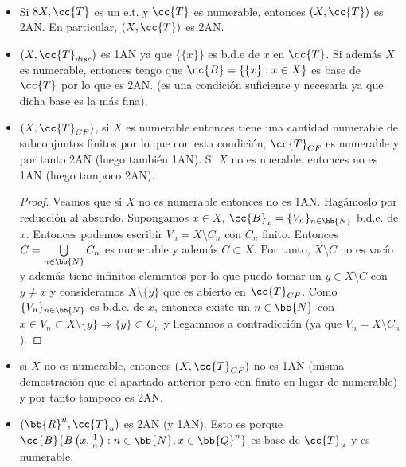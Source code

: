\begin{ejemplo}\
    \begin{itemize}
        \item Si $8X, \cc{T}$ es un e.t. y $\cc{T}$ es numerable, entonces $(X, \cc{T})$ es 2AN. En particular, $(X, \cc{T})$ es 2AN.
        \item $(X, \cc{T}_{disc})$ es 1AN ya que $\{\{x\}\}$ es b.d.e de $x$ en $\cc{T}$. Si además $X$ es numerable, entonces tengo que $\cc{B}=\{\{x\}:x\in X\}$ es base de $\cc{T}$ por lo que es 2AN. (es una condición suficiente y necesaria ya que dicha base es la más fina).
        \item $(X, \cc{T}_{CF})$, si $X$ es numerable entonces tiene una cantidad numerable de subconjuntos finitos por lo que con esta condición, $\cc{T}_{CF}$ es numerable y por tanto 2AN (luego también 1AN). Si $X$ no es nuerable, entonces no es 1AN (luego tampoco 2AN).
        
        \begin{proof}
            Veamos que si $X$ no es numerable entonces no es 1AN. Hagámoslo por reducción al absurdo. Supongamos $x \in X$, $\cc{B}_x=\{V_n\}_{n\in \bb{N}}$ b.d.e. de $x$. Entonces podemos escribir $V_n = X \setminus C_n$ con $C_n$ finito. Entonces $C=\bigcup\limits_{n\in \bb{N}}C_n$ es numerable y además $C\subset X$. Por tanto, $X\setminus C$ no es vacío y además tiene infinitos elementos por lo que puedo tomar un $y\in X\setminus C$ con $y\neq x$ y consideramos $X\setminus\{y\}$ que es abierto en $\cc{T}_{CF}$. Como $\{V_n\}_{n\in \bb{N}}$ es b.d.e. de $x$, entonces existe un $n\in \bb{N}$ con $x\in V_n\subset X\setminus \{y\}\Rightarrow \{y\}\subset C_n$ y llegammos a contradicción (ya que $V_n = X\setminus C_n$).
        \end{proof}
        \item si $X$ no es numerable, entonces $(X, \cc{T}_{CF})$ no es 1AN (misma demostración que el apartado anterior pero con finito en lugar de numerable) y por tanto tampoco es 2AN.
        
        \item $(\bb{R}^n, \cc{T}_u)$ es 2AN (y 1AN). Esto es porque $\cc{B}\{B\left(x, \frac{1}{n}\right) : n\in \bb{N}, x \in \bb{Q}^n\}$ es base de $\cc{T}_u$ y es numerable.
    \end{itemize}
    \endsquare
\end{ejemplo}

